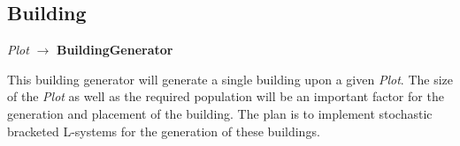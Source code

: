 \subsection{Building}
\begin{center}    
    \textit{Plot} $\rightarrow$ \textbf{BuildingGenerator}
\end{center}
This building generator will generate a single building upon a given \textit{Plot}. 
The size of the \textit{Plot} as well as the required population will be an important factor for the generation and placement of the building. 
The plan is to implement stochastic bracketed L-systems for the generation of these buildings.

